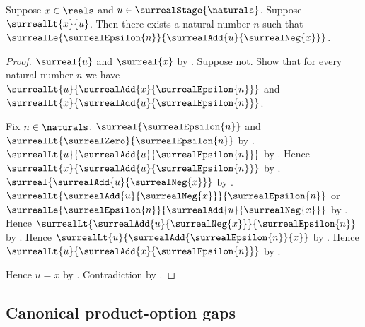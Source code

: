 \begin{lemma}\label{real_upper_epsilon_gap}
    Suppose $x\in\reals$ and $u\in\surrealStage{\naturals}$.
    Suppose $\surrealLt{x}{u}$.
    Then there exists a natural number $n$ such that
        $\surrealLe{\surrealEpsilon{n}}
            {\surrealAdd{u}{\surrealNeg{x}}}$.
\end{lemma}
\begin{proof}
    $\surreal{u}$ and $\surreal{x}$
        by
        .
    Suppose not.
    Show that for every natural number $n$ we have
        $\surrealLt{u}{\surrealAdd{x}{\surrealEpsilon{n}}}$ and
        $\surrealLt{x}{\surrealAdd{u}{\surrealEpsilon{n}}}$.
    \begin{subproof}
        Fix $n\in\naturals$.
        $\surreal{\surrealEpsilon{n}}$ and
            $\surrealLt{\surrealZero}{\surrealEpsilon{n}}$
            by
            .
        $\surrealLt{u}{\surrealAdd{u}{\surrealEpsilon{n}}}$
            by
            .
        Hence $\surrealLt{x}{\surrealAdd{u}{\surrealEpsilon{n}}}$
            by
            .
        $\surreal{\surrealAdd{u}{\surrealNeg{x}}}$
            by
            .
        $\surrealLt
            {\surrealAdd{u}{\surrealNeg{x}}}
            {\surrealEpsilon{n}}$ or
            $\surrealLe
                {\surrealEpsilon{n}}
                {\surrealAdd{u}{\surrealNeg{x}}}$
            by .
        Hence
            $\surrealLt
                {\surrealAdd{u}{\surrealNeg{x}}}
                {\surrealEpsilon{n}}$
            by \auto.
        Hence $\surrealLt{u}{\surrealAdd{\surrealEpsilon{n}}{x}}$
            by .
        Hence $\surrealLt{u}{\surrealAdd{x}{\surrealEpsilon{n}}}$
            by .
    \end{subproof}
    Hence $u=x$ by .
    Contradiction by .
\end{proof}

\subsection{Canonical product-option gaps}

